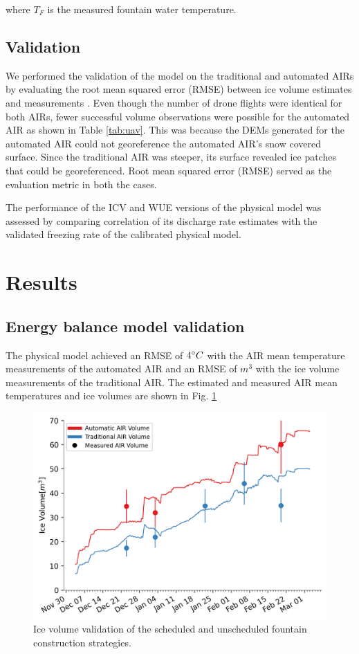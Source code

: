 \documentclass[tc, manuscript]{copernicus}
\begin{document}
where $T_{F}$ is the measured fountain water temperature.


\subsection{Validation}

We performed the validation of the model on the traditional and automated AIRs by evaluating the root mean
squared error (RMSE) between ice volume estimates and measurements . Even though the number of drone flights
were identical for both AIRs, fewer successful volume observations were possible for the automated AIR as shown
in Table \ref{tab:uav}. This was because the DEMs generated for the automated AIR could not georeference the
automated AIR's snow covered surface. Since the traditional AIR was steeper, its surface revealed ice patches
that could be georeferenced. Root mean squared error (RMSE) served as the evaluation metric in both the cases.

The performance of the ICV and WUE versions of the physical model was assessed by comparing correlation of its
discharge rate estimates with the validated freezing rate of the calibrated physical model.

\section{Results}

\subsection{Energy balance model validation}
The physical model achieved an RMSE of $4 ^{\circ} C$ with the AIR mean temperature measurements of the automated AIR and an RMSE of $m^3$ with the ice volume measurements of the traditional AIR. The estimated and measured AIR
mean temperatures and ice volumes are shown in Fig. \ref{fig:validation}
 
\begin{figure}[t] 
  \includegraphics[width=12cm]{Figures/validation.png} 
  \caption{Ice volume validation of the scheduled and unscheduled fountain construction strategies.} 
\label{fig:validation} 
\end{figure}
\end{document}

